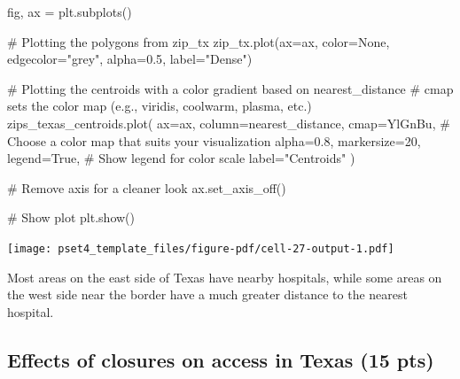 \documentclass[
  letterpaper,
  DIV=11,
  numbers=noendperiod]{scrartcl}
\newenvironment{Shaded}{\begin{snugshade}}{\end{snugshade}}
\newcommand{\CommentTok}[1]{\textcolor[rgb]{0.37,0.37,0.37}{#1}}
\newcommand{\DecValTok}[1]{\textcolor[rgb]{0.68,0.00,0.00}{#1}}
\newcommand{\FloatTok}[1]{\textcolor[rgb]{0.68,0.00,0.00}{#1}}
\newcommand{\NormalTok}[1]{\textcolor[rgb]{0.00,0.23,0.31}{#1}}
\newcommand{\OperatorTok}[1]{\textcolor[rgb]{0.37,0.37,0.37}{#1}}
\newcommand{\StringTok}[1]{\textcolor[rgb]{0.13,0.47,0.30}{#1}}
\newcommand{\VariableTok}[1]{\textcolor[rgb]{0.07,0.07,0.07}{#1}}
\begin{document}
\begin{Shaded}
\begin{Highlighting}[]
\NormalTok{fig, ax }\OperatorTok{=}\NormalTok{ plt.subplots()}

\CommentTok{\# Plotting the polygons from zip\_tx}
\NormalTok{zip\_tx.plot(ax}\OperatorTok{=}\NormalTok{ax, color}\OperatorTok{=}\VariableTok{None}\NormalTok{, edgecolor}\OperatorTok{=}\StringTok{"grey"}\NormalTok{, alpha}\OperatorTok{=}\FloatTok{0.5}\NormalTok{, label}\OperatorTok{=}\StringTok{"Dense"}\NormalTok{)}

\CommentTok{\# Plotting the centroids with a color gradient based on \textquotesingle{}nearest\_distance\textquotesingle{}}
\CommentTok{\# \textasciigrave{}cmap\textasciigrave{} sets the color map (e.g., \textquotesingle{}viridis\textquotesingle{}, \textquotesingle{}coolwarm\textquotesingle{}, \textquotesingle{}plasma\textquotesingle{}, etc.)}
\NormalTok{zips\_texas\_centroids.plot(}
\NormalTok{    ax}\OperatorTok{=}\NormalTok{ax,}
\NormalTok{    column}\OperatorTok{=}\StringTok{\textquotesingle{}nearest\_distance\textquotesingle{}}\NormalTok{,}
\NormalTok{    cmap}\OperatorTok{=}\StringTok{\textquotesingle{}YlGnBu\textquotesingle{}}\NormalTok{,  }\CommentTok{\# Choose a color map that suits your visualization}
\NormalTok{    alpha}\OperatorTok{=}\FloatTok{0.8}\NormalTok{,}
\NormalTok{    markersize}\OperatorTok{=}\DecValTok{20}\NormalTok{,}
\NormalTok{    legend}\OperatorTok{=}\VariableTok{True}\NormalTok{,  }\CommentTok{\# Show legend for color scale}
\NormalTok{    label}\OperatorTok{=}\StringTok{"Centroids"}
\NormalTok{)}

\CommentTok{\# Remove axis for a cleaner look}
\NormalTok{ax.set\_axis\_off()}

\CommentTok{\# Show plot}
\NormalTok{plt.show()}
\end{Highlighting}
\end{Shaded}

\texttt{[image: pset4\_template\_files/figure-pdf/cell-27-output-1.pdf]}

Most areas on the east side of Texas have nearby hospitals, while some
areas on the west side near the border have a much greater distance to
the nearest hospital.

\subsection{Effects of closures on access in Texas (15
pts)}\label{effects-of-closures-on-access-in-texas-15-pts}
\end{document}
